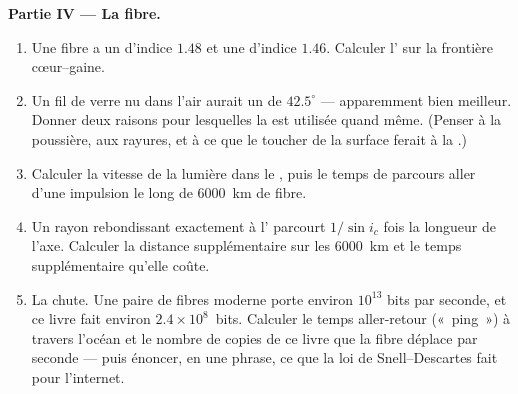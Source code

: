 \begin{problem}
\medskip
\noindent\textbf{Partie IV --- La fibre.}
\begin{enumerate}[resume]
  \item Une fibre a un  d'indice $1.48$ et une
         d'indice $1.46$. Calculer l' sur
        la frontière cœur--gaine.
  \item Un fil de verre nu dans l'air aurait un  de
        $42.5^\circ$ --- apparemment bien meilleur. Donner deux raisons
        pour lesquelles la  est utilisée quand même. (Penser à
        la poussière, aux rayures, et à ce que le toucher de la surface
        ferait à la .)
  \item Calculer la vitesse de la lumière dans le , puis le
        temps de parcours aller d'une impulsion le long de
        \qty{6000}{km} de fibre.
  \item Un rayon rebondissant exactement à l'
        parcourt $1/\sin i_c$ fois la longueur de l'axe. Calculer la
        distance supplémentaire sur les \qty{6000}{km} et le temps
        supplémentaire qu'elle coûte.
  \item La chute. Une paire de fibres moderne porte environ $10^{13}$
        bits par seconde, et ce livre fait environ
        $2.4 \times 10^8$~bits. Calculer le temps aller-retour
        («~ping~») à travers l'océan et le nombre de copies de ce livre
        que la fibre déplace par seconde --- puis énoncer, en une
        phrase, ce que la loi de Snell--Descartes fait pour
        l'internet.
\end{enumerate}
\end{problem}
